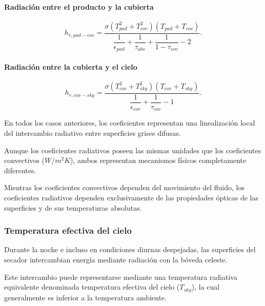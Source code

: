 \paragraph{Radiación entre el producto y la cubierta}

\begin{equation}
h_{r,pad-cov}
=
\frac{
\sigma
(T_{pad}^2+T_{cov}^2)
(T_{pad}+T_{cov})
}
{
\dfrac1{\epsilon_{pad}}
+
\dfrac1{\tau_{abs}}
+
\dfrac1{1-\tau_{cov}}
-
2
}.
\end{equation}

\paragraph{Radiación entre la cubierta y el cielo}

\begin{equation}
h_{r,cov-sky}
=
\frac{
\sigma
(T_{cov}^2+T_{sky}^2)
(T_{cov}+T_{sky})
}
{
\dfrac1{\epsilon_{cov}}
+
\dfrac1{\tau_{cov}}
-
1
}.
\end{equation}

En todos los casos anteriores, los coeficientes representan una linealización local del intercambio radiativo entre superficies grises difusas.

\begin{tcolorbox}[title=Observación,colback=green!5,colframe=green!60!black]

Aunque los coeficientes radiativos poseen las mismas unidades que los coeficientes convectivos ($W/m^2K$), ambos representan mecanismos físicos completamente diferentes.

Mientras los coeficientes convectivos dependen del movimiento del fluido, los coeficientes radiativos dependen exclusivamente de las propiedades ópticas de las superficies y de sus temperaturas absolutas.

\end{tcolorbox}

\subsubsection{Temperatura efectiva del cielo}

Durante la noche e incluso en condiciones diurnas despejadas, las superficies del secador intercambian energía mediante radiación con la bóveda celeste.

Este intercambio puede representarse mediante una temperatura radiativa equivalente denominada temperatura efectiva del cielo ($T_{sky}$), la cual generalmente es inferior a la temperatura ambiente.


